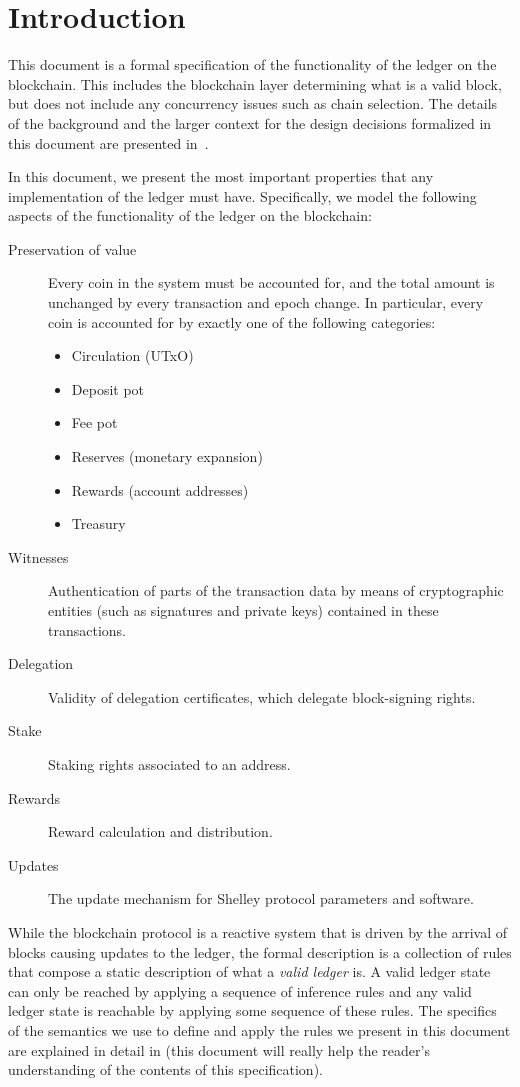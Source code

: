 \section{Introduction}
\label{sec:introduction-shelley}

This document is a formal specification of the functionality of the ledger on the blockchain.
This includes the blockchain layer determining what is a valid block,
but does not include any concurrency issues such as chain selection.
The details of the background and the larger context
for the design decisions formalized in this document are presented
in~\cite{delegation_design}.

In this document,
we present the most important properties that any implementation of the ledger must have.
Specifically, we model the following aspects
of the functionality of the ledger on the blockchain:

\begin{description}
\item[Preservation of value] Every coin in the system must be accounted for,
  and the total amount is unchanged by every transaction and epoch change.
  In particular, every coin is accounted for by exactly one of the following categories:
  \begin{itemize}
    \item Circulation (UTxO)
    \item Deposit pot
    \item Fee pot
    \item Reserves (monetary expansion)
    \item Rewards (account addresses)
    \item Treasury
  \end{itemize}
\item[Witnesses] Authentication of parts of the transaction data by means of
  cryptographic entities (such as signatures and private keys) contained in
  these transactions.
\item[Delegation] Validity of delegation certificates, which delegate
  block-signing rights.
\item[Stake] Staking rights associated to an address.
\item[Rewards] Reward calculation and distribution.
\item[Updates] The update mechanism for Shelley protocol parameters and software.
\end{description}

While the blockchain protocol is a reactive system that is driven by the arrival
of blocks causing updates to the ledger, the formal description is a collection
of rules that compose a
static description of what a \textit{valid ledger} is. A valid ledger state can only
be reached by applying a sequence of inference rules and any valid ledger state
is reachable by applying some sequence of these rules.
The specifics of the semantics we use to define and apply
the rules we present in this document are explained in detail in
\cite{small_step_semantics} (this document will really help the reader's
understanding of the contents of this specification).

